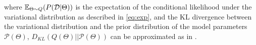 where $\mathbb{E}_{\Theta \sim Q} (P (\mathcal{D} | \Theta) )$ is the expectation of the conditional likelihood under the variational distribution as described in \autoref{eq:exp}, and the KL divergence between the variational distribution and the prior distribution of the model parameters $\mathcal{P}(\Theta)$, $D_{KL}(Q( \Theta) ||\mathcal{P}( \Theta))$ can be approximated  as in \cite{gal2016uncertainty}.
%


